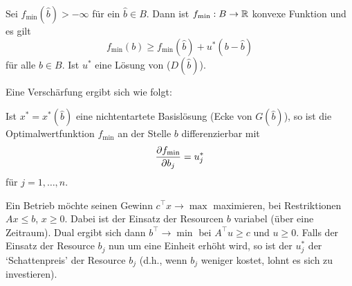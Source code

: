     \begin{lemma}
        Sei $f_{\min}(\hat b)> -\infty$ für ein $\hat b\in B$. Dann ist $f_{\min}:B\rightarrow \mathbb{R}$ konvexe Funktion und es gilt
        $$
        f_{\min}(b)\geq f_{\min}(\hat b)+u^{\ast}(b-\hat b)
        $$
        für alle $b\in B$. Ist $u^\ast$ eine Lösung von ($D(\hat b)$).
    \end{lemma}

    Eine Verschärfung ergibt sich wie folgt:

    Ist $x^\ast=x^\ast(\hat b)$ eine nichtentartete Basislösung (Ecke von $G(\hat b)$), so ist die Optimalwertfunktion $f_{\min}$ an der Stelle $b$ differenzierbar mit
    $$
    \frac{\partial{f_{\min}}}{\partial{b_j}} = u^\ast_j
    $$
    für $j=1,\ldots,n$.

    \begin{example}
        Ein Betrieb möchte seinen Gewinn $c^\top x \to \max$ maximieren, bei Restriktionen $Ax\leq b$, $x\geq 0$. Dabei ist der Einsatz der Resourcen $b$ variabel (über eine Zeitraum). Dual ergibt sich dann $b^\top \to \min$ bei $A^\top u\geq c$ und $u\geq 0$.
        Falls der Einsatz der Resource $b_j$ nun um eine Einheit erhöht wird, so ist der $u^\ast_j$ der `Schattenpreis' der Resource $b_j$ (d.h., wenn $b_j$ weniger kostet, lohnt es sich zu investieren).
    \end{example}
